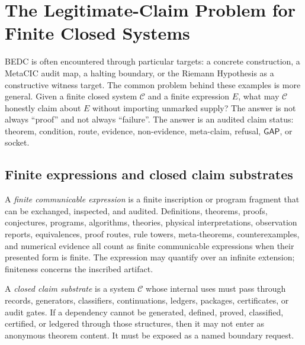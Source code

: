 \chapter{The Legitimate-Claim Problem for Finite Closed Systems}
\label{ch:visions-legitimate-claim-audit}

BEDC is often encountered through particular targets: a concrete
\NameCert{} construction, a MetaCIC audit map, a halting boundary, or the
Riemann Hypothesis as a constructive witness target.  The common problem
behind these examples is more general.  Given a finite closed system
$\mathcal C$ and a finite expression $E$, what may $\mathcal C$ honestly
claim about $E$ without importing unmarked supply?  The answer is not always
``proof'' and not always ``failure''.  The answer is an audited claim status:
theorem, condition, route, evidence, non-evidence, meta-claim, refusal,
$\mathsf{GAP}$, or socket.

\section{Finite expressions and closed claim substrates}
\label{sec:legitimate-claim-finite-expressions}

\begin{definition}
\label{def:legitimate-claim-finite-expression}
A \emph{finite communicable expression} is a finite inscription or program
fragment that can be exchanged, inspected, and audited.  Definitions,
theorems, proofs, conjectures, programs, algorithms, theories, physical
interpretations, observation reports, equivalences, proof routes, rule
towers, meta-theorems, counterexamples, and numerical evidence all count as
finite communicable expressions when their presented form is finite.  The
expression may quantify over an infinite extension; finiteness concerns the
inscribed artifact.
\end{definition}

\begin{definition}
\label{def:closed-claim-substrate}
A \emph{closed claim substrate} is a system $\mathcal C$ whose internal uses
must pass through records, generators, classifiers, continuations, ledgers,
packages, certificates, or audit gates.  If a dependency cannot be generated,
defined, proved, classified, certified, or ledgered through those structures,
then it may not enter as anonymous theorem content.  It must be exposed as a
named boundary request.
\end{definition}

